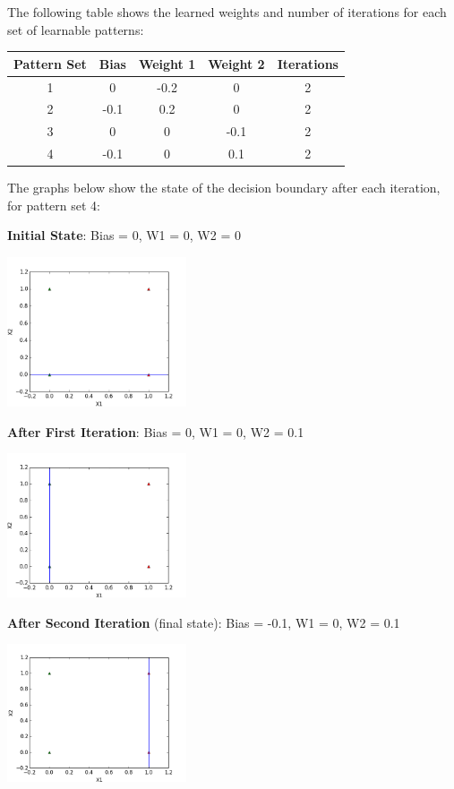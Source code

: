 \documentclass{article}
\begin{document}
The following table shows the learned weights and number of iterations for each set of learnable patterns:
\begin{center}
    \begin{tabular}{ c | c | c | c | c }
        Pattern Set & Bias & Weight 1 & Weight 2 & Iterations \\
        \hline
        1           & 0    & -0.2     & 0        & 2          \\
        \hline
        2           & -0.1 & 0.2      & 0        & 2          \\
        \hline
        3           & 0    & 0        & -0.1     & 2          \\
        \hline
        4           & -0.1 & 0        & 0.1      & 2          \\
    \end{tabular}
\end{center}

The graphs below show the state of the decision boundary after each iteration, for pattern set 4: \\

\centerline{\textbf{Initial State}: Bias = 0, W1 = 0, W2 = 0}
\centerline{\includegraphics[width=200px]{partA1_iter1}}
\vspace{6mm}
\centerline{\textbf{After First Iteration}: Bias = 0, W1 = 0, W2 = 0.1}
\centerline{\includegraphics[width=200px]{partA1_iter2}}
\vspace{6mm}
\centerline{\textbf{After Second Iteration} (final state): Bias = -0.1, W1 = 0, W2 = 0.1}
\centerline{\includegraphics[width=200px]{partA1_iter3}}
\end{document}

